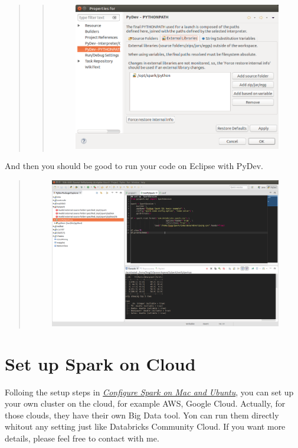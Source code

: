 \documentclass[letterpaper,11pt,english]{sphinxmanual}
\begin{document}
\begin{quote}
\begin{quote}
\begin{figure}[htbp]
\includegraphics{pydevPath.png}
\label{setup:fig-pydevpath}\end{figure}
\end{quote}
\end{quote}

And then you should be good to run your code on Eclipse with PyDev.
\begin{quote}
\begin{figure}[htbp]
\centering

\includegraphics{pysparkWithEclipse.png}
\label{setup:fig-pysparkwitheclipse}\end{figure}
\end{quote}


\section{Set up Spark on Cloud}
\label{setup:set-up-spark-on-cloud}\label{setup:index-2}
Folloing the setup steps in {\hyperref[setup:set-up-ubuntu]{\emph{Configure Spark on Mac and Ubuntu}}}, you can set
up your own cluster on the cloud, for example AWS, Google Cloud.
Actually, for those clouds, they have their own Big Data tool.
Yon can run them directly whitout any setting just like
Databricks Community Cloud. If you want more details, please feel
free to contact with me.
\end{document}
